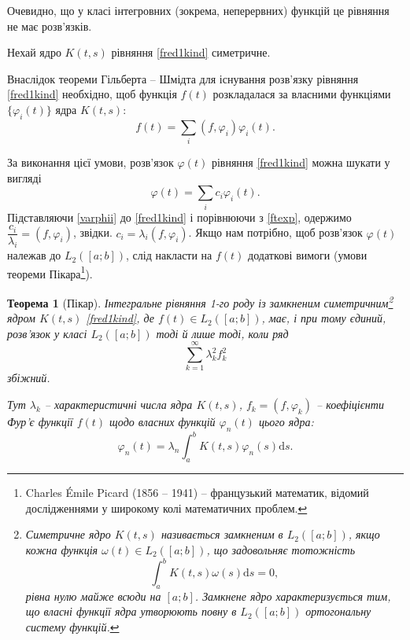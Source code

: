 \documentclass[14pt,twoside]{extreport}
\theoremstyle{mystyle}
\newtheorem{thm}{Теорема}
\numberwithin{equation}{chapter}
\begin{document}
Очевидно, що у класі інтегровних (зокрема, неперервних) функцій це рівняння не має розв'язків.

Нехай ядро $K(t, s)$ рівняння \eqref{fred1kind} симетричне.

Внаслідок теореми Гільберта -- Шмідта для існування розв'язку рівняння \eqref{fred1kind} необхідно, щоб функція $f(t)$ розкладалася за власними функціями $\{\varphi_i(t)\}$ ядра $K(t, s)$:
\begin{equation}\label{ftexp}
 f(t) = \sum_{i} (f, \varphi_i) \varphi_i(t).
\end{equation}

За виконання цієї умови, розв'язок $\varphi(t)$ рівняння \eqref{fred1kind} можна шукати у вигляді
\begin{equation}\label{varphii}
 \varphi(t) = \sum_{i} c_i \varphi_i(t).
\end{equation}
Підставляючи \eqref{varphii} до \eqref{fred1kind} і порівнюючи з \eqref{ftexp}, одержимо $\dfrac{c_i}{\lambda_i} = (f, \varphi_i)$, звідки. $c_i = \lambda_i (f, \varphi_i)$. Якщо нам потрібно, щоб розв'язок $\varphi(t)$ належав до $L_2([a; b])$, слід накласти на $f(t)$ додаткові вимоги (умови теореми Пікара\footnote{Charles \'{E}mile Picard (1856 -- 1941) -- французький математик, відомий дослідженнями у широкому колі математичних проблем.}).

\begin{thm}[Пікар]
Інтегральне рівняння 1-го роду із замкненим симетричним\footnote{Симетричне ядро $K(t, s)$ називається замкненим в $L_2([a; b])$, якщо кожна функція $\omega(t) \in L_2([a; b])$, що задовольняє тотожність
\[
 \int_{a}^{b} K(t, s) \omega(s) \mathrm{d}s = 0,
\]
рівна нулю майже всюди на $[a; b]$. Замкнене ядро характеризується тим, що власні функції ядра утворюють повну в $L_2([a; b])$ ортогональну систему функцій.} ядром $K(t, s)$ \eqref{fred1kind}, де $f(t) \in L_2([a; b])$, має, і при тому єдиний, розв'язок у класі $L_2([a; b])$ тоді й лише тоді, коли ряд
\begin{equation}\label{lfseries}
 \sum_{k=1}^{\infty} \lambda_k^2 f_k^2
\end{equation}
збіжний.

Тут $\lambda_k$ -- характеристичні числа ядра $K(t, s)$, $f_k = (f, \varphi_k)$ -- коефіцієнти Фур'є функції $f(t)$ щодо власних функцій $\varphi_n(t)$ цього ядра:
\begin{equation}
 \varphi_n(t) = \lambda_n \int_{a}^{b} K(t, s) \varphi_n(s) \mathrm{d}s.
\end{equation}
\end{thm}
\end{document}
